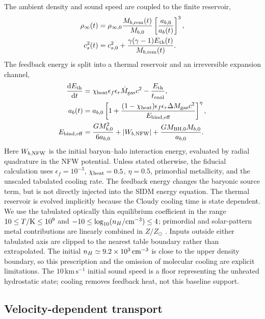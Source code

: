 \documentclass[11pt]{article}
\newcommand{\kms}{\,\mathrm{km\,s^{-1}}}
\newcommand{\dd}{\mathrm{d}}
\begin{document}
The ambient density and sound speed are coupled to the finite reservoir,
\begin{align}
 \rho_\infty(t)&=\rho_{\infty,0}\frac{M_{b,\rm rem}(t)}{M_{b,0}}\left[\frac{a_{b,0}}{a_b(t)}\right]^3,\\
 c_s^2(t)&=c_{s,0}^2+\frac{\gamma(\gamma-1)E_{\rm th}(t)}{M_{b,\rm rem}(t)} .
 \label{eq:ambient}
\end{align}
The feedback energy is split into a thermal reservoir and an irreversible expansion channel,
\begin{align}
 \frac{\dd E_{\rm th}}{\dd t}&=\chi_{\rm heat}\epsilon_f\epsilon_r\dot M_{\rm gas}c^2-\frac{E_{\rm th}}{t_{\rm cool}},\\
 a_b(t)&=a_{b,0}\left[1+\frac{(1-\chi_{\rm heat})\epsilon_f\epsilon_r\Delta M_{\rm gas}c^2}{E_{\rm bind,eff}}\right]^\eta, \\
 E_{\rm bind,eff}&=\frac{G M_{b,0}^2}{6a_{b,0}}+|W_{b,{\rm NFW}}|+\frac{G M_{{\rm BH},0}M_{b,0}}{a_{b,0}} .
 \label{eq:feedback}
\end{align}
Here $W_{b,{\rm NFW}}$ is the initial baryon--halo interaction energy, evaluated by radial quadrature in the NFW potential.  Unless stated otherwise, the fiducial calculation uses $\epsilon_f=10^{-3}$, $\chi_{\rm heat}=0.5$, $\eta=0.5$, primordial metallicity, and the unscaled tabulated cooling rate.  The feedback energy changes the baryonic source term, but is not directly injected into the SIDM energy equation.  The thermal reservoir is evolved implicitly because the Cloudy cooling time is state dependent.  We use the tabulated optically thin equilibrium coefficient in the range $10\le T/{\rm K}\le10^9$ and $-10\le\log_{10}(n_H/{\rm cm}^{-3})\le4$; primordial and solar-pattern metal contributions are linearly combined in $Z/Z_\odot$ \citep{Ferland2017,Smith2017}.  Inputs outside either tabulated axis are clipped to the nearest table boundary rather than extrapolated.  The initial $n_H\simeq9.2\times10^3\,{\rm cm^{-3}}$ is close to the upper density boundary, so this prescription and the omission of molecular cooling are explicit limitations.  The $10\kms$ initial sound speed is a floor representing the unheated hydrostatic state; cooling removes feedback heat, not this baseline support.

\subsection{Velocity-dependent transport}
\end{document}

